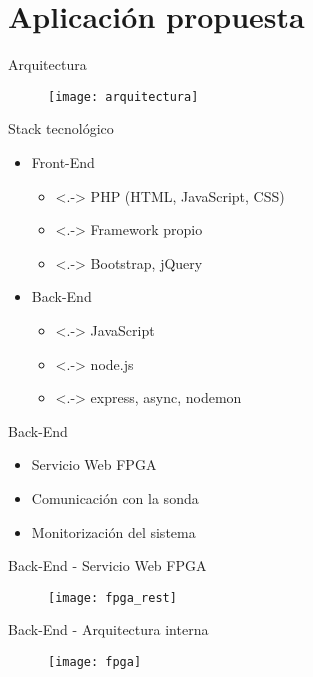 \section{Aplicación propuesta}

\begin{frame}{Arquitectura}
  \begin{figure}
    \texttt{[image: arquitectura]}
  \end{figure}
\end{frame}

\begin{frame}{Stack tecnológico}
  \begin{itemize}[<+->]
    \item \alert{Front-End}
    \begin{itemize}
      \item<.-> PHP (HTML, JavaScript, CSS)
      \item<.-> Framework propio
      \item<.-> Bootstrap, jQuery
    \end{itemize}
    \item \alert{Back-End}
    \begin{itemize}
      \item<.-> JavaScript
      \item<.-> node.js
      \item<.-> express, async, nodemon
    \end{itemize}
  \end{itemize}
\end{frame}

\begin{frame}{Back-End}
  \begin{itemize}[<alert@+>]
    \item Servicio Web FPGA
    \item Comunicación con la sonda
    \item Monitorización del sistema
  \end{itemize}
\end{frame}

\begin{frame}{Back-End - Servicio Web FPGA}
  \begin{figure}
    \texttt{[image: fpga\_rest]}
  \end{figure}
\end{frame}

\begin{frame}{Back-End - Arquitectura interna}
  \begin{figure}
    \texttt{[image: fpga]}
  \end{figure}
\end{frame}

